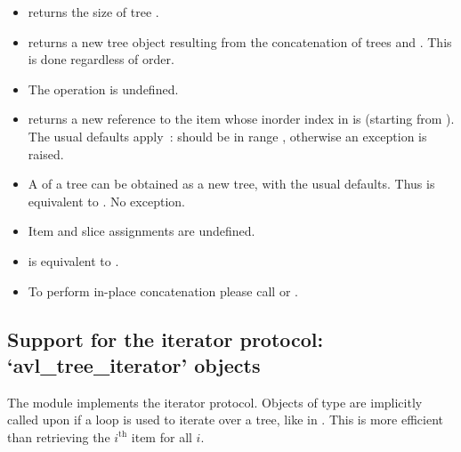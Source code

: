 \documentclass{howto}
\begin{document}
\begin{itemize}
	\item  {} returns the size of tree .

	\item  {} returns a new tree object resulting from the concatenation 
	of trees  and . This is done regardless of order.

	\item  The  operation is undefined.
	
	\item  {} returns a new reference to the item whose inorder index 
	in  is  (starting from ).
	The usual defaults apply~:  should be in range 
	, otherwise
	an  exception is raised.
	
	\item  A  of a tree can be obtained as a new tree, with the 
	usual defaults.
	Thus  is equivalent to .
	No exception.
	
	\item  Item and slice assignments are undefined.
	
	\item  {} is equivalent to .
	
	\item To perform in-place concatenation please call  
	or .
\end{itemize}

\subsection{Support for the \textbf{iterator} protocol: `avl_tree_iterator' objects}
\label{iterator}

\begin{seealso}
\end{seealso}

The  module implements the iterator protocol. 
Objects of type  are implicitly called upon 
if a  loop is used to iterate over a tree,
like in . This is more 
efficient than retrieving the $i^{\mathrm{th}}$ item for all $i$.
\end{document}
